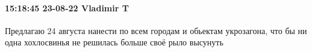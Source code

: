  
 
 
 
 

\paragraph{15:18:45 23-08-22 Vladimir T}

Предлагаю 24 августа нанести по всем городам и обьектам укрозагона, что бы ни
одна хохлосвинья не решилась больше своё рыло высунуть
